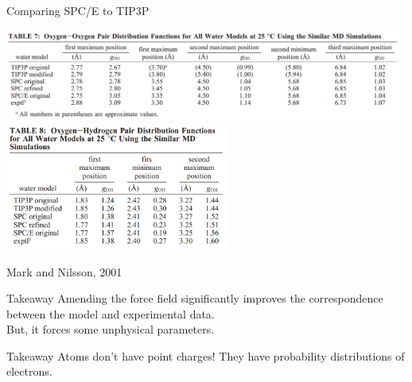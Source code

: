\documentclass{beamer}
\begin{document}
\begin{frame}{Comparing SPC/E to TIP3P}
    \begin{center}
    \includegraphics[width=0.98\textwidth]{images/watercomp_rdfsOO.png} \\
    \includegraphics[width=0.55\textwidth]{images/watercomp_rdfsOH.png}
    \end{center}
{\footnotesize Mark and Nilsson, 2001}
\end{frame}

\begin{frame}{Takeaway}
Amending the force field significantly improves the correspondence between the
model and experimental data. \\[\baselineskip]
But, it forces some unphysical parameters.
\end{frame}

\begin{frame}{Takeaway}
\Huge{Atoms don't have point charges! They have probability distributions of
electrons.}
\end{frame}
\end{document}
